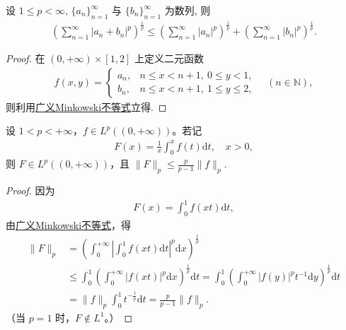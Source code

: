 \documentclass[../../main.tex]{subfiles}%
\begin{document}
\begin{theorem}[离散Minkowski不等式]\label{theorem:离散Minkowski不等式}
设 $1\leqslant p<\infty$, $\{a_n\}_{n=1}^{\infty}$ 与 $\{b_n\}_{n=1}^{\infty}$ 为数列, 则
\begin{align*}
\left(\sum\limits_{n=1}^\infty |a_n+b_n|^p\right)^{\frac{1}{p}} \leqslant \left(\sum\limits_{n=1}^\infty |a_n|^p\right)^{\frac{1}{p}} + \left(\sum\limits_{n=1}^\infty |b_n|^p\right)^{\frac{1}{p}}.
\end{align*}
\end{theorem}
\begin{proof}
在 $(0,+\infty)\times[1,2]$ 上定义二元函数
\begin{align*}
f(x,y) =
\begin{cases}
a_n, & n\leqslant x<n+1,\ 0\leqslant y<1, \\
b_n, & n\leqslant x<n+1,\ 1\leqslant y\leqslant 2,
\end{cases}
\quad (n\in\mathbb{N}),
\end{align*}
则利用\hyperref[theorem:广义Minkowski不等式]{广义Minkowski不等式}立得.
\end{proof}

\begin{example}
设 $1<p<+\infty$，$f\in L^p((0,+\infty))$。若记
\begin{align*}
F(x) = \frac{1}{x} \int_0^x f(t)\mathrm{d}t, \quad x>0,
\end{align*}
则 $F\in L^p((0,+\infty))$，且 $\|F\|_p \leqslant \frac{p}{p-1}\|f\|_p$.
\end{example}

\begin{proof}
因为
\begin{align*}
F(x) = \int_0^1 f(xt)\mathrm{d}t,
\end{align*}
由\hyperref[theorem:广义Minkowski不等式]{广义Minkowski不等式}，得
\begin{align*}
\|F\|_p &= \left( \int_0^{+\infty} \left| \int_0^1 f(xt)\mathrm{d}t \right|^p \mathrm{d}x \right)^{\frac{1}{p}} \\
&\leqslant \int_0^1 \left( \int_0^{+\infty} |f(xt)|^p \mathrm{d}x \right)^{\frac{1}{p}} \mathrm{d}t = \int_0^1 \left( \int_0^{+\infty} |f(y)|^p t^{-1} \mathrm{d}y \right)^{\frac{1}{p}} \mathrm{d}t \\
&= \|f\|_p \int_0^1 t^{-\frac{1}{p}} \mathrm{d}t = \frac{p}{p-1}\|f\|_p.
\end{align*}
（当 $p=1$ 时，$F\notin L^1$。）
\end{proof}
\end{document}
